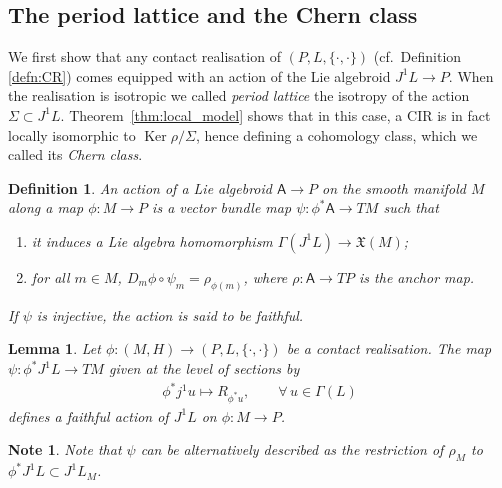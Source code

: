 \documentclass[10pt,a4paper]{amsart}
\numberwithin{equation}{section}
\newtheorem{Lemma}[Theorem]{Lemma}
\newtheorem{Definition}[Theorem]{Definition}
\newtheorem{Note}[Theorem]{Note}
\newcommand{\X}{\ensuremath{\mathfrak{X}}}
\newcommand{\Ker}{\operatorname{Ker}} %
\newcommand{\JM}{(P,L,\{\cdot,\cdot\})} %
\newcommand{\CM}{(M,H)} %
\begin{document}
\subsection{The period lattice and the Chern class}

 We f\/irst show that any contact realisation of $\JM$ (cf.\ Def\/inition \ref{defn:CR}) comes equipped with an action of the Lie algebroid $J^1L \to P$. When the realisation is isotropic we called {\it period lattice} the isotropy of the action $\Sigma\subset J^1L$. Theorem~\ref{thm:local_model} shows that in this case, a CIR is in fact locally isomorphic to $\Ker\rho/\Sigma$, hence def\/ining a cohomology class, which we called its {\it Chern class}.

\begin{Definition}\label{defn:action_alg} An {\it action} of a Lie algebroid $\mathsf{A} \to P$ on the smooth manifold $M$ along a map $\phi \colon M \to P$ is a vector bundle map $\psi\colon \phi^*\mathsf{A} \to TM$ such that
 \begin{enumerate}[label=(A\arabic*), ref=(A\arabic*)]\itemsep=0pt
 \item \label{item:3} it induces a Lie algebra homomorphism $\Gamma(J^1L)\to \X(M)$;
 \item \label{item:4} for all $m \in M$, $D_m\phi\circ \psi_m=\rho_{\phi(m)}$, where $\rho \colon \mathsf{A} \to TP$ is the anchor map.
 \end{enumerate}
 If $\psi$ is injective, the action is said to be {\em faithful}.
\end{Definition}

\begin{Lemma}\label{lemma:action}
 Let $\phi\colon \CM\to\JM$ be a contact realisation. The map $\psi\colon \phi^*J^1L\to T M$ given at the level of sections by
 \begin{gather*}
 \phi^*j^1 u\mapsto R_{\phi^*u},\qquad \forall\, u\in \Gamma(L)
 \end{gather*}
defines a faithful action of $J^1L$ on $\phi \colon M \to P$.
\end{Lemma}

\begin{Note}\label{rk:action}
Note that $\psi$ can be alternatively described as the restriction of $\rho_M$ to $\phi^*J^1L \subset J^1L_M$.
\end{Note}
\end{document}

